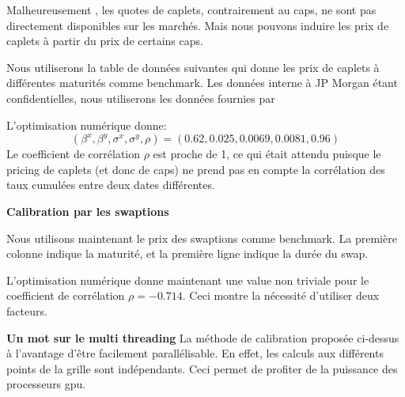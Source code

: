 Malheureusement , les quotes de caplets, contrairement au caps, ne sont pas directement disponibles sur les marchés. Mais nous pouvons induire les prix de caplets à partir du prix de certains caps.

Nous utiliserons la table de données suivantes qui donne les prix de caplets à différentes maturités comme benchmark.
Les données interne à JP Morgan étant confidentielles, nous utiliserons les données fournies par \cite{Brugo}



L'optimisation numérique donne:
$$ (\beta^x, \beta^y, \sigma^x, \sigma^y, \rho) = (0.62, 0.025, 0.0069, 0.0081, 0.96) $$
Le coefficient de corrélation $\rho$ est proche de 1, ce qui était attendu puisque le pricing de caplets (et donc de caps) ne prend pas en compte la corrélation des taux cumulées entre deux dates différentes.

\textbf{Calibration par les swaptions}

Nous utilisons maintenant le prix des  swaptions comme benchmark. La première colonne indique la maturité, et la première ligne indique la durée du swap.



L'optimisation numérique donne maintenant une value non triviale pour le coefficient de corrélation $\rho = -0.714$. Ceci montre la nécessité d'utiliser deux facteurs.



\textbf{Un mot sur le multi threading}
La méthode de calibration proposée ci-dessus à l'avantage d'être facilement parallélisable. En effet, les calculs aux différents points de la grille sont indépendants. Ceci permet de profiter de la puissance des processeurs gpu.

